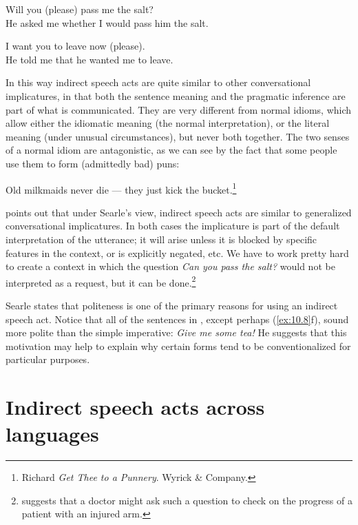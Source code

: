 \ea \label{ex:10.12}
\ea Will you (please) pass me the salt?\\
\ex He asked me whether I would pass him the salt.
                       \z
\z

\ea \label{ex:10.13}
\ea I want you to leave now (please).\\
\ex He told me that he wanted me to leave.
                       \z
\z


In this way indirect speech acts are quite similar to other conversational implicatures, in that both the sentence meaning and the pragmatic inference are part of what is communicated. They are very different from normal idioms, which allow either the idiomatic meaning (the normal interpretation), or the literal meaning (under unusual circumstances), but never both together. The two senses of a normal idiom are antagonistic, as we can see by the fact that some people use them to form (admittedly bad) puns:


\ea \label{ex:10.14}
Old milkmaids never die — they just kick the bucket.\footnote{Richard \citet{Lederer1988} \textit{Get Thee to a Punnery}. Wyrick \& Company.}
\z


\citet[196]{Birner2012} points out that under Searle’s view, indirect speech acts are similar to generalized conversational implicatures. In both cases the implicature is part of the default interpretation of the utterance; it will arise unless it is blocked by specific features in the context, or is explicitly negated, etc. We have to work pretty hard to create a context in which the question \textit{Can you pass the salt?} would not be interpreted as a request, but it can be done.\footnote{\citet[69]{Searle1975} suggests that a doctor might ask such a question to check on the progress of a patient with an injured arm.}



Searle states that politeness is one of the primary reasons for using an indirect speech act. Notice that all of the sentences in , except perhaps (\ref{ex:10.8}f), sound more polite than the simple imperative: \textit{Give me some tea!} He suggests that this motivation may help to explain why certain forms tend to be conventionalized for particular purposes.



\section{Indirect speech acts across languages}\label{sec:10.4}

